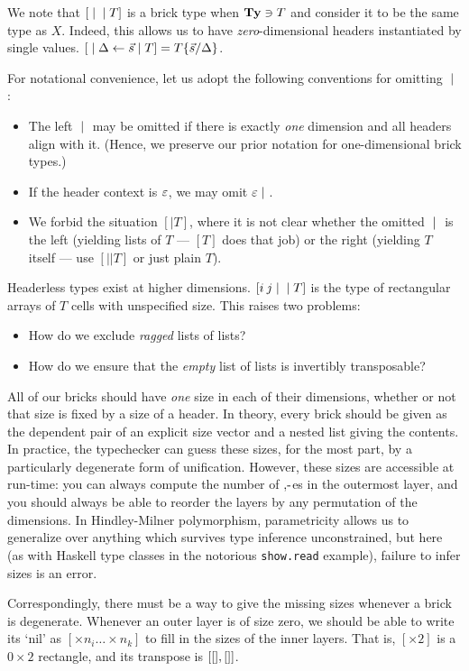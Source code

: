 \documentclass{article}
\begin{document}
We note that $[\;|\;\;|\; T]$ is a brick type when $\mathbf{Ty}\ni T$ and consider it to be the same type as $X$. Indeed, this allows us to have \emph{zero}-dimensional headers instantiated by single values. $[\;|\;\Delta\leftarrow\vec s\;|\; T] = T\{\vec s/\Delta\}$.

For notational convenience, let us adopt the following conventions for omitting $\;|\;$:
\begin{itemize}
\item The left $\;|\;$ may be omitted if there is exactly \emph{one} dimension and all headers align with it. (Hence, we preserve our prior notation for one-dimensional brick types.)
\item If the header context is $\varepsilon$, we may omit $\varepsilon\;|\;$.
\item We forbid the situation $[|T]$, where it is not clear whether the omitted $\;|\;$ is the left (yielding lists of $T$ --- $[T]$ does that job) or the right (yielding $T$ itself --- use $[||T]$ or just plain $T$).
\end{itemize}

Headerless types exist at higher dimensions. $[i\: j\;|\; \;|\; T]$ is the type of rectangular arrays of $T$ cells with unspecified size. This raises two problems:
\begin{itemize}
\item How do we exclude \emph{ragged} lists of lists?
\item How do we ensure that the \emph{empty} list of lists is invertibly transposable?
\end{itemize}

All of our bricks should have \emph{one} size in each of their dimensions, whether or not that size is fixed by a size of a header. In theory, every brick should be given as the dependent pair of an explicit size vector and a nested list giving the contents. In practice, the typechecker can guess these sizes, for the most part, by a particularly degenerate form of unification. However, these sizes are accessible at run-time: you can always compute the number of $\mbox{$,\!\textrm{-}$}$es in the outermost layer, and you should always be able to reorder the layers by any permutation of the dimensions. In Hindley-Milner polymorphism, parametricity allows us to generalize over anything which survives type inference unconstrained, but here (as with Haskell type classes in the notorious \texttt{show.read} example), failure to infer sizes is an error.

Correspondingly, there must be a way to give the missing sizes whenever a brick is degenerate. Whenever an outer layer is of size zero, we should be able to write its `nil' as $[\times n_i\ldots\times n_k]$ to fill in the sizes of the inner layers. That is, $[\times 2]$ is a $0\times 2$ rectangle, and its transpose is $[[],[]]$.
\end{document}
